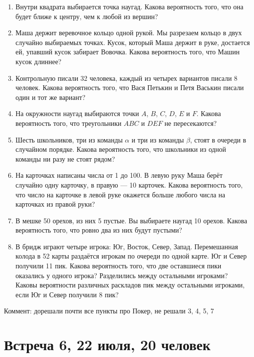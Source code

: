 \documentclass[pdftex,12pt,a4paper]{article}
\begin{document}
\begin{enumerate}


\item Внутри квадрата выбирается точка наугад. Какова вероятность того, что она будет ближе к центру, чем к любой из вершин?

\item Маша держит веревочное кольцо одной рукой. Мы разрезаем кольцо в двух случайно выбираемых точках. Кусок, который Маша держит в руке, достается ей, упавший кусок забирает Вовочка. Какова вероятность того, что Машин кусок длиннее?

\item Контрольную писали 32 человека, каждый из четырех вариантов писали 8 человек. Какова вероятность того, что Вася Петькин и Петя Васькин писали один и тот же вариант?

\item На окружности наугад выбираются точки $A$, $B$, $C$, $D$, $E$ и $F$. Какова вероятность того, что треугольники $ABC$ и $DEF$ не пересекаются?

\item Шесть школьников, три из команды $\alpha$ и три из команды $\beta$, стоят в очереди в случайном порядке. Какова вероятность того, что школьники из одной команды ни разу не стоят рядом?

\item На карточках написаны числа от 1 до 100. В левую руку Маша берёт случайно одну карточку, в правую --- 10 карточек. Какова вероятность того, что число на карточке в левой руке окажется больше любого числа на карточках из правой руки?

\item В мешке 50 орехов, из них 5 пустые. Вы выбираете наугад 10 орехов. Какова вероятность того, что ровно два из них будут пустыми?

\item В бридж играют четыре игрока: Юг, Восток, Север, Запад. Перемешанная колода в 52 карты раздаётся игрокам по очереди по одной карте. Юг и Север получили 11 пик. Какова вероятность того, что две оставшиеся пики оказались у одного игрока? Разделились между остальными игроками? Каковы вероятности различных раскладов пик между остальными игроками, если Юг и Север получили 8 пик?

\end{enumerate}

Коммент: дорешали почти все пункты про Покер, не решали 3, 4, 5, 7

\newpage
\section{Встреча 6, 22 июля, 20 человек}
\end{document}

